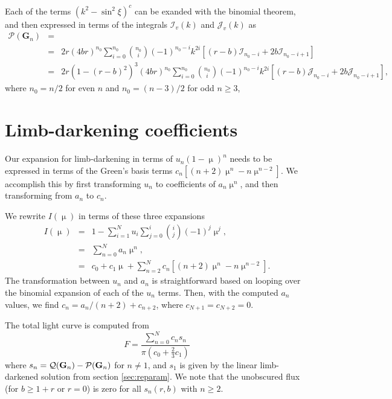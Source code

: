 \documentclass[modern]{aastex61}
\begin{document}
Each of the terms $(k^2-\sin^2\xi)^c$ can be exanded with the binomial theorem,
and then expressed in terms of the integrals $\mathcal{I}_v(k)$ and $\mathcal{J}_v(k)$ as
\begin{eqnarray}
\mathcal{P}(\mathbf{G}_n) &=& \\
&=& 2r(4br)^{n_0} \sum_{i=0}^{n_0} \binom{n_0}{i}(-1)^{n_0-i} k^{2i} \left[(r-b)\mathcal{I}_{n_0-i} + 2b \mathcal{I}_{n_0-i+1}\right]\\ 
&=& 2r(1-(r-b)^2)^3(4br)^{n_0} \sum_{i=0}^{n_0} \binom{n_0}{i} (-1)^{n_0-i} k^{2i} \left[(r-b)\mathcal{J}_{n_0-i} + 2b \mathcal{J}_{n_0-i+1}\right],
\end{eqnarray}
where $n_0 = n/2$ for even $n$ and $n_0 = (n-3)/2$ for odd $n \ge 3$,

\section{Limb-darkening coefficients}

Our expansion for limb-darkening in terms of $u_n(1-\upmu)^n$ needs to
be expressed in terms of the Green's basis terms $c_n \left[(n+2)\upmu^n -n \upmu^{n-2}\right]$.
We accomplish this by first transforming $u_n$ to coefficients of $a_n \upmu^n$,
and then transforming from $a_n$ to $c_n$.

We rewrite $I(\upmu)$ in terms of these three expansions
\begin{eqnarray}
I(\upmu) &=& 1 - \sum_{i=1}^N u_i \sum_{j=0}^i \binom{i}{j} (-1)^j \upmu^j,\\
&=& \sum_{n=0}^N a_n \upmu^n,\\
&=& c_0 + c_1 \upmu + \sum_{n=2}^N c_n \left[(n+2)\upmu^n -n \upmu^{n-2}\right].
\end{eqnarray}
The transformation between $u_n$ and $a_n$ is straightforward based on
looping over the binomial expansion of each of the $u_n$ terms.  Then,
with the computed $a_n$ values, we find $c_n = a_n/(n+2) + c_{n+2}$,
where $c_{N+1}=c_{N+2}=0$.

The total light curve is computed from
\begin{equation}
F = \frac{\sum_{n=0}^N c_n s_n}{\pi(c_0+ \tfrac{2}{3} c_1)}
\end{equation}
where $s_n = \mathcal{Q}({\mathbf{G}}_n) - \mathcal{P}({\mathbf{G}}_n)$ for $n \ne 1$,
and $s_1$ is given by the linear limb-darkened solution from section \ref{sec:reparam}.
We note that the unobscured flux (for $b \ge 1+r$ or $r=0$) is zero for
all $s_n(r,b)$ with $n \ge 2$.
\end{document}
